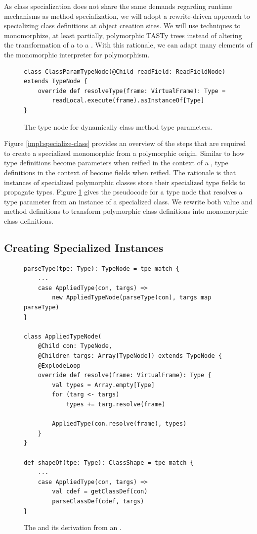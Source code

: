 As class specialization does not share the same demands regarding runtime mechanisms as method specialization, we will adopt a rewrite-driven approach to specializing class definitions at object creation sites.
We will use techniques to monomorphize, at least partially, polymorphic TASTy trees instead of altering the transformation of a  to a .
With this rationale, we can adapt many elements of the monomorphic interpreter for polymorphism.

\begin{figure}[!htb]
\begin{verbatim}
class ClassParamTypeNode(@Child readField: ReadFieldNode) extends TypeNode {
	override def resolveType(frame: VirtualFrame): Type = 
		readLocal.execute(frame).asInstanceOf[Type]
}
\end{verbatim}
\caption{The type node for dynamically class method type parameters.}
\label{impl:class-param-typenode}
\end{figure}

Figure \ref{impl:specialize-class} provides an overview of the steps that are required to create a specialized monomorphic  from a polymorphic origin.
Similar to how type definitions become parameters when reified in the context of a , type definitions in the context of  become fields when reified.
The rationale is that instances of specialized polymorphic classes store their specialized type fields to propagate types.
Figure \ref{impl:class-param-typenode} gives the pseudocode for a type node that resolves a type parameter from an instance of a specialized class.
We rewrite both value and method definitions to transform polymorphic class definitions into monomorphic class definitions.

\subsection{Creating Specialized Instances}

\begin{figure}[!htb]
\begin{verbatim}
parseType(tpe: Type): TypeNode = tpe match {
	...
	case AppliedType(con, targs) => 
		new AppliedTypeNode(parseType(con), targs map parseType) 
}

class AppliedTypeNode(	
	@Child con: TypeNode, 
	@Children targs: Array[TypeNode]) extends TypeNode {
	@ExplodeLoop
	override def resolve(frame: VirtualFrame): Type {
		val types = Array.empty[Type]
		for (targ <- targs)
			types += targ.resolve(frame)
		
		AppliedType(con.resolve(frame), types)
	}
}

def shapeOf(tpe: Type): ClassShape = tpe match {
	...
	case AppliedType(con, targs) => 
		val cdef = getClassDef(con)
		parseClassDef(cdef, targs)
}
\end{verbatim}
\caption{The  and its derivation from an .}
\label{impl:applied-type-node}
\end{figure}

